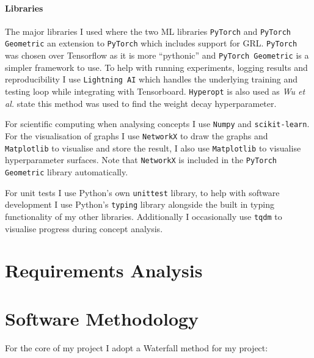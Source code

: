 \paragraph{Libraries}
\label{sec:libraries}

The major libraries I used where the two ML libraries \texttt{PyTorch}  and \texttt{PyTorch Geometric} \cite{Fey/Lenssen/2019} an extension to \texttt{PyTorch} which includes support for GRL.
\texttt{PyTorch} was chosen over Tensorflow as it is more ``pythonic'' and \texttt{PyTorch Geometric} is a simpler framework to use.
To help with running experiments, logging results and reproducibility I use \texttt{Lightning AI} which handles the underlying training and testing loop while integrating with Tensorboard.
\texttt{Hyperopt} is also used as \textit{Wu et al.}\cite{wu2019simplifying} state this method was used to find the weight decay hyperparameter.

For scientific computing when analysing concepts I use \texttt{Numpy} and \texttt{scikit-learn}. For the visualisation of graphs I use \texttt{NetworkX} to draw the graphs and \texttt{Matplotlib} to visualise and store the result, I also use \texttt{Matplotlib} to visualise hyperparameter surfaces. Note that \texttt{NetworkX} is included in the \texttt{PyTorch Geometric} library automatically.

For unit tests I use Python's own \texttt{unittest} library, to help with software development I use Python's \texttt{typing} library alongside the built in typing functionality of my other libraries. Additionally I occasionally use \texttt{tqdm} to visualise progress during concept analysis.

\section{Requirements Analysis}


\section{Software Methodology}


For the core of my project I adopt a Waterfall method  for my project:

